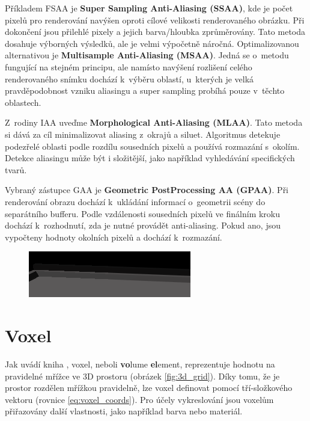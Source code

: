 Příkladem FSAA je \textbf{Super Sampling Anti-Aliasing (SSAA)}, kde je počet pixelů pro renderování navýšen oproti cílové velikosti renderovaného obrázku. Při dokončení jsou přilehlé pixely a jejich barva/hloubka zprůměrovány. Tato metoda dosahuje výborných výsledků, ale je velmi výpočetně náročná. Optimalizovanou alternativou je \textbf{Multisample Anti-Aliasing (MSAA)}. Jedná se o~metodu fungující na stejném principu, ale namísto navýšení rozlišení celého renderovaného snímku dochází k~výběru oblastí, u~kterých je velká pravděpodobnost vzniku aliasingu a super sampling probíhá pouze v~těchto oblastech.

Z~rodiny IAA uveďme \textbf{Morphological Anti-Aliasing (MLAA)}. Tato metoda si dává za cíl minimalizovat aliasing z~okrajů a siluet. Algoritmus detekuje podezřelé oblasti podle rozdílu sousedních pixelů a používá rozmazání s~okolím. Detekce aliasingu může být i složitější, jako například vyhledávání specifických tvarů.


Vybraný zástupce GAA je \textbf{Geometric PostProcessing AA (GPAA)}. Při renderování obrazu dochází k~ukládání informací o~geometrii scény do separátního bufferu. Podle vzdálenosti sousedních pixelů ve finálním kroku dochází k~rozhodnutí, zda je nutné provádět anti-aliasing. Pokud ano, jsou vypočteny hodnoty okolních pixelů a dochází k~rozmazání.

\begin{figure}[H]
	\centering
	\includegraphics[scale=3]{obrazky-figures/ssaa_diff.png}
	\captionsetup{justification=centering}
	\label{fig:aliasing_ssaa}
\end{figure}




\section{Voxel} \label{voxels}
Jak uvádí kniha \cite{gfx_principles_practice}, voxel, neboli \textbf{vo}lume \textbf{el}ement, reprezentuje hodnotu na pravidelné mřížce ve 3D prostoru (obrázek \ref{fig:3d_grid}). Díky tomu, že je prostor rozdělen mřížkou pravidelně, lze voxel definovat pomocí tří-složkového vektoru (rovnice \ref{eq:voxel_coords}). Pro účely vykreslování jsou voxelům přiřazovány další vlastnosti, jako například barva nebo materiál.


